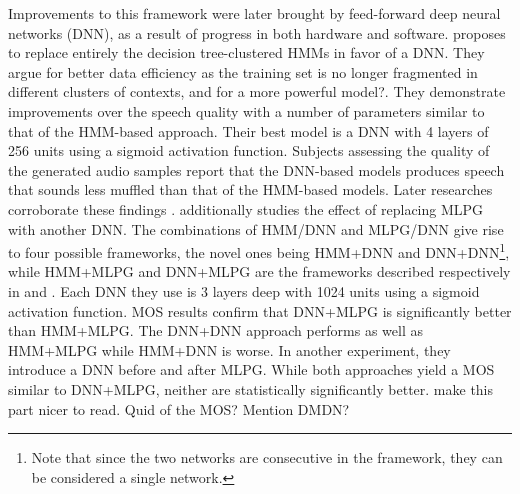 \documentclass[a4paper, oneside]{article}
\begin{document}
Improvements to this framework were later brought by feed-forward deep neural networks (DNN), as a result of progress in both hardware and software. \citep{SPSSDNN} proposes to replace entirely the decision tree-clustered HMMs in favor of a DNN. They argue for better data efficiency as the training set is no longer fragmented in different clusters of contexts\color{red}, and for a more powerful model?\color{black}. They demonstrate improvements over the speech quality with a number of parameters similar to that of the HMM-based approach. Their best model is a DNN with 4 layers of 256 units using a sigmoid activation function. Subjects assessing the quality of the generated audio samples report that the DNN-based models produces speech that sounds less muffled than that of the HMM-based models. Later researches corroborate these findings \citep{OnTheTrainingAspects}. \citep{Hashimoto-2015} additionally studies the effect of replacing MLPG with another DNN. The combinations of HMM/DNN and MLPG/DNN give rise to four possible frameworks, the novel ones being HMM+DNN and DNN+DNN\footnote{Note that since the two networks are consecutive in the framework, they can be considered a single network.}, while HMM+MLPG and DNN+MLPG are the frameworks described respectively in \citep{Tokuda-2013} and \citep{SPSSDNN}. Each DNN they use is 3 layers deep with 1024 units using a sigmoid activation function. MOS results confirm that DNN+MLPG is significantly better than HMM+MLPG. The DNN+DNN approach performs as well as HMM+MLPG while HMM+DNN is worse. In another experiment, they introduce a DNN before and after MLPG. While both approaches yield a MOS similar to DNN+MLPG, neither are statistically significantly better. \color{red} make this part nicer to read. Quid of the MOS? Mention DMDN?\color{black}

\end{document}

